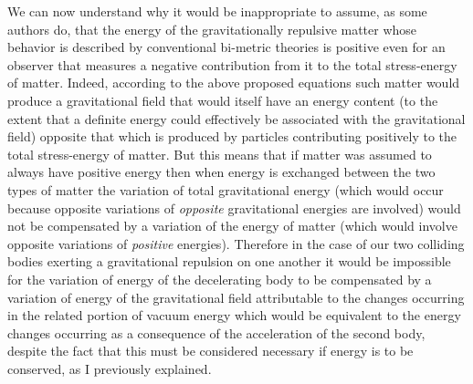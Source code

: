 \documentclass[notitlepage,12pt]{report}
\begin{document}
We can now understand why it would be inappropriate to assume, as some authors do, that the energy of the gravitationally repulsive matter whose behavior is described by conventional bi-metric theories is positive even for an observer that measures a negative contribution from it to the total stress-energy of matter. Indeed, according to the above proposed equations such matter would produce a gravitational field that would itself have an energy content (to the extent that a definite energy could effectively be associated with the gravitational field) opposite that which is produced by particles contributing positively to the total stress-energy of matter. But this means that if matter was assumed to always have positive energy then when energy is exchanged between the two types of matter the variation of total gravitational energy (which would occur because opposite variations of \textit{opposite} gravitational energies are involved) would not be compensated by a variation of the energy of matter (which would involve opposite variations of \textit{positive} energies). Therefore in the case of our two colliding bodies exerting a gravitational repulsion on one another it would be impossible for the variation of energy of the decelerating body to be compensated by a variation of energy of the gravitational field attributable to the changes occurring in the related portion of vacuum energy which would be equivalent to the energy changes occurring as a consequence of the acceleration of the second body, despite the fact that this must be considered necessary if energy is to be conserved, as I previously explained.
\end{document}
